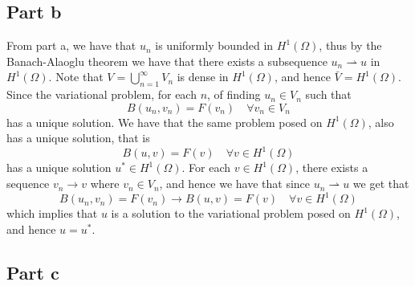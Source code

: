 \documentclass[12pt]{report}
\begin{document}
\subsection*{Part b}
From part a, we have that $u_n$ is uniformly bounded in $H^1(\Omega)$, thus by the Banach-Alaoglu theorem we have that there exists a subsequence $u_n \rightharpoonup u$ in $H^1(\Omega)$.
Note that $V = \bigcup_{n=1}^\infty V_n$ is dense in $H^1(\Omega)$, and hence $\bar{V} = H^1(\Omega)$. Since the variational problem, for each $n$, of finding $u_n \in V_n$ such that 
\begin{equation*}
  B(u_n, v_n) = F(v_n) \quad \forall v_n \in V_n
\end{equation*}
has a unique solution. We have that the same problem posed on $H^1(\Omega)$, also has a unique solution, that is
\begin{equation*}
  B(u,v) = F(v) \quad \forall v \in H^1(\Omega)
\end{equation*}
has a unique solution $u^* \in H^1(\Omega)$. For each $v \in H^1(\Omega)$, there exists a sequence $v_n \to v$ where $v_n \in V_n$, and hence we have that since $u_n \rightharpoonup u$ we get that
\begin{equation*}
B(u_n, v_n) = F(v_n) \to B(u,v) = F(v) \quad \forall v \in H^1(\Omega)
\end{equation*}
which implies that $u$ is a solution to the variational problem posed on $H^1(\Omega)$, and hence $u = u^*$.

\subsection*{Part c}
\end{document}
